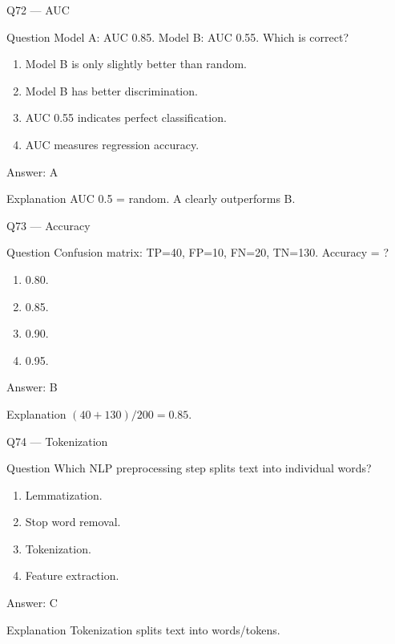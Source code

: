 \documentclass[aspectratio=169,8pt]{beamer}
\begin{document}
	\begin{frame}{Q72 --- AUC}
		\begin{block}{Question}
			Model A: AUC 0.85. Model B: AUC 0.55. Which is correct?
		\end{block}
		\begin{enumerate}
			\item Model B is only slightly better than random.
			\item Model B has better discrimination.
			\item AUC 0.55 indicates perfect classification.
			\item AUC measures regression accuracy.
		\end{enumerate}
		\begin{exampleblock}{Answer: A}\end{exampleblock}
		\begin{block}{Explanation}
			AUC 0.5 = random. A clearly outperforms B.
		\end{block}
	\end{frame}
	
	\begin{frame}{Q73 --- Accuracy}
		\begin{block}{Question}
			Confusion matrix: TP=40, FP=10, FN=20, TN=130. Accuracy = ?
		\end{block}
		\begin{enumerate}
			\item 0.80.
			\item 0.85.
			\item 0.90.
			\item 0.95.
		\end{enumerate}
		\begin{exampleblock}{Answer: B}\end{exampleblock}
		\begin{block}{Explanation}
			$(40+130)/200 = 0.85$.
		\end{block}
	\end{frame}
	
	\begin{frame}{Q74 --- Tokenization}
		\begin{block}{Question}
			Which NLP preprocessing step splits text into individual words?
		\end{block}
		\begin{enumerate}
			\item Lemmatization.
			\item Stop word removal.
			\item Tokenization.
			\item Feature extraction.
		\end{enumerate}
		\begin{exampleblock}{Answer: C}\end{exampleblock}
		\begin{block}{Explanation}
			Tokenization splits text into words/tokens.
		\end{block}
	\end{frame}
	
\end{document}
